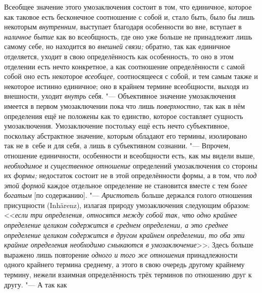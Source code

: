 Всеобщее значение этого умозаключения состоит в том, что
единичное, которое как таковое есть бесконечное соотношение с собой и,
стало быть, было бы лишь некоторым
{\em внутренним,}
выступает благодаря особенности во вне, вступает в
{\em наличное бытие} как
во всеобщность, где оно уже больше не принадлежит лишь самому себе, но
находится во {\em внешней связи;}
обратно, так как единичное отделяется, уходит в свою
определённость как особенность, то оно в этом отделении есть
нечто конкретное, а как соотношение определённости с самой собой оно есть
некоторое {\em всеобщее,}
соотносящееся с собой, и тем самым также и некоторое истинно
единичное; оно в крайнем термине всеобщности, выходя из внешности, уходит
{\em внутрь} себя. "---
Объективное значение умозаключения имеется в первом
умозаключении пока что лишь
{\em поверхностно,} так
как в нём определения ещё не положены как то единство, которое составляет
сущность умозаключения. Умозаключение постольку ещё есть нечто
субъективное, поскольку абстрактное значение, которым обладают его термины,
изолировано так не в~себе и для себя, а лишь в субъективном сознании. "---
Впрочем, отношение единичности, особенности и всеобщности
есть, как мы видели выше,
{\em необходимое} и
{\em существенное отношение}
определений умозаключения со стороны их
{\em формы;} недостаток
состоит не в этой определённости формы, а в том, что
{\em под этой формой}
каждое отдельное определение не становится вместе с тем
{\em более богатым} [по
содержанию]. "--- {\em Аристотель}
больше держался голого отношения присущности (Inhärenz),
излагая природу умозаключения следующим образом:
<<{\em если три определения, относятся
между собой так, что одно крайнее определение целиком содержится в среднем
определении, а это среднее определение целиком содержится в другом крайнем
определении, то оба эти крайние определения необходимо смыкаются в
умозаключение}>>.
Здесь больше выражено лишь повторение
{\em одного и того же отношения}
принадлежности одного крайнего термина среднему, а этого в
свою очередь другому крайнему термину, нежели взаимная определённость трёх
терминов по отношению друг к другу. "--- А так как

